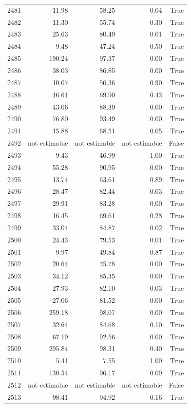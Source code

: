 \begin{longtable}{rrrrr}
2481 & 11.98 & 58.25 & 0.04 & True \\
2482 & 11.30 & 55.74 & 0.30 & True \\
2483 & 25.63 & 80.49 & 0.01 & True \\
2484 & 9.48 & 47.24 & 0.50 & True \\
2485 & 190.24 & 97.37 & 0.00 & True \\
2486 & 38.03 & 86.85 & 0.00 & True \\
2487 & 10.07 & 50.36 & 0.90 & True \\
2488 & 16.61 & 69.90 & 0.43 & True \\
2489 & 43.06 & 88.39 & 0.00 & True \\
2490 & 76.80 & 93.49 & 0.00 & True \\
2491 & 15.88 & 68.51 & 0.05 & True \\
2492 & not estimable & not estimable & not estimable & False \\
2493 & 9.43 & 46.99 & 1.00 & True \\
2494 & 55.28 & 90.95 & 0.00 & True \\
2495 & 13.74 & 63.61 & 0.89 & True \\
2496 & 28.47 & 82.44 & 0.03 & True \\
2497 & 29.91 & 83.28 & 0.00 & True \\
2498 & 16.45 & 69.61 & 0.28 & True \\
2499 & 33.04 & 84.87 & 0.02 & True \\
2500 & 24.43 & 79.53 & 0.01 & True \\
2501 & 9.97 & 49.84 & 0.87 & True \\
2502 & 20.64 & 75.78 & 0.00 & True \\
2503 & 34.12 & 85.35 & 0.00 & True \\
2504 & 27.93 & 82.10 & 0.03 & True \\
2505 & 27.06 & 81.52 & 0.00 & True \\
2506 & 259.18 & 98.07 & 0.00 & True \\
2507 & 32.64 & 84.68 & 0.10 & True \\
2508 & 67.19 & 92.56 & 0.00 & True \\
2509 & 295.84 & 98.31 & 0.40 & True \\
2510 & 5.41 & 7.55 & 1.00 & True \\
2511 & 130.54 & 96.17 & 0.09 & True \\
2512 & not estimable & not estimable & not estimable & False \\
2513 & 98.41 & 94.92 & 0.16 & True \\

\end{longtable}
